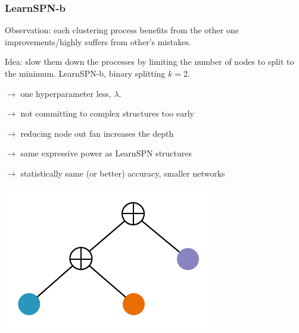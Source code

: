 \documentclass[10pt, t, xcolor={usenames,dvipsnames,svgnames}, compress]{beamer}
\begin{document}
\begin{frame}
  \frametitle{LearnSPN-b}
  Observation: each clustering process benefits from the other one improvements/highly suffers
  from other's mistakes.\par\bigskip

  Idea: slow them down the processes by limiting the number of
  nodes to split to the minimum.
  \textsf{LearnSPN-b}, binary splitting $k=2$.\par%

  $\rightarrow$ one hyperparameter less, $\lambda$.\par%
  $\rightarrow$ not committing to complex structures too early\par
  $\rightarrow$ reducing node out fan increases the depth\par
  $\rightarrow$ same expressive power as LearnSPN structures\par
  $\rightarrow$ statistically same (or better) accuracy, smaller
  networks\par%
  \begin{center}
    \raisebox{30pt}{\hspace{20pt}\Huge$=$\hspace{10pt}}
    \includegraphics[width=0.3\linewidth]{figures/learnspn-4.pdf}
  \end{center}

%
  \end{frame}
\end{document}
